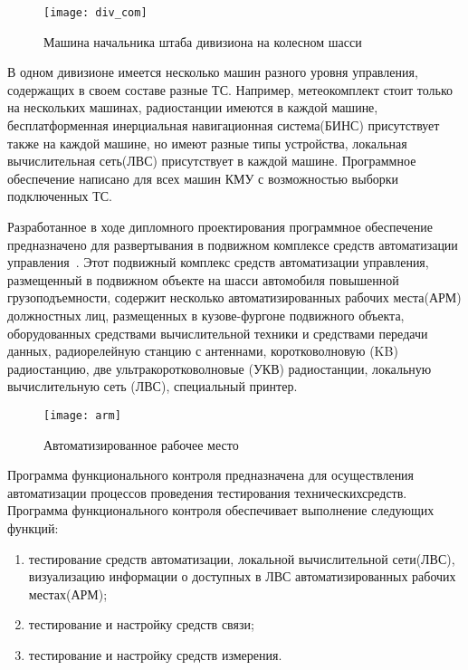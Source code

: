 \begin{figure}[ht]
	\centering
	\texttt{[image: div\_com]}
	\caption{Машина начальника штаба дивизиона на колесном шасси~\cite{div_car}}
	\label{fig:lit_reiview:analytics:div_com}
\end{figure}
В одном дивизионе имеется несколько машин разного уровня управления, содержащих в своем составе разные ТС.
Например, метеокомплект стоит только на нескольких машинах, радиостанции имеются в каждой машине, бесплатформенная
инерциальная навигационная система(БИНС) присутствует также на каждой машине, но имеют разные типы устройства, локальная вычислительная сеть(ЛВС) присутствует в каждой машине.
Программное обеспечение написано для всех машин КМУ с возможностью выборки подключенных ТС.

Разработанное в ходе дипломного проектирования программное обеспечение предназначено для развертывания в подвижном
комплексе средств автоматизации управления~\cite{patent_2263960}.
Этот подвижный комплекс средств автоматизации управления, размещенный в подвижном объекте на шасси автомобиля повышенной
грузоподъемности, содержит несколько автоматизированных рабочих места(АРМ) должностных лиц, размещенных в кузове-фургоне
подвижного объекта, оборудованных средствами вычислительной техники и средствами передачи данных, радиорелейную станцию
с антеннами, коротковолновую (KB) радиостанцию, две ультракоротковолновые (УКВ) радиостанции, локальную вычислительную
сеть (ЛВС), специальный принтер.

\begin{figure}[ht]
	\centering
	\texttt{[image: arm]}
	\caption{Автоматизированное рабочее место~\cite{patent_2263960}}
	\label{fig:lit_reiview:analytics:arm}
\end{figure}

Программа функционального контроля предназначена для осуществления автоматизации процессов проведения тестирования
технических\break средств.
Программа функционального контроля обеспечивает выполнение следующих функций:
\begin{enumerate}
\item тестирование средств автоматизации, локальной вычислительной сети(ЛВС), визуализацию информации о доступных в ЛВС автоматизированных рабочих местах(АРМ);
\item тестирование и настройку средств связи;
\item тестирование и настройку средств измерения.
\end{enumerate}

